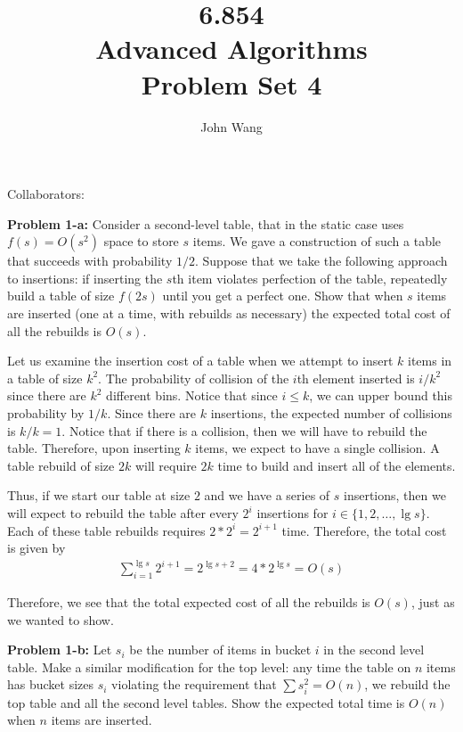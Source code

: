 \documentclass[psamsfonts]{amsart}
\title{6.854 \\
Advanced Algorithms \\
Problem Set 4}
\author{John Wang}
\newenvironment{sol}{\vspace{0.25cm}{\large \bfseries Solution:}}{\qedsymbol}
\newenvironment{prob}[1]{\begin{framed}{\large \bfseries Problem #1:}}{\end{framed}}
\begin{document}
\maketitle

Collaborators: 

\begin{prob}{1-a}
Consider a second-level table, that in the static case uses $f(s) = O(s^2)$ space to store $s$ items. We gave a construction of such a table that succeeds with probability $1/2$. Suppose that we take the following approach to insertions: if inserting the $s$th item violates perfection of the table, repeatedly build a table of size $f(2s)$ until you get a perfect one. Show that when $s$ items are inserted (one at a time, with rebuilds as necessary) the expected total cost of all the rebuilds is $O(s)$. 
\end{prob}

\begin{sol}
Let us examine the insertion cost of a table when we attempt to insert $k$ items in a table of size $k^2$. The probability of collision of the $i$th element inserted is $i/k^2$ since there are $k^2$ different bins. Notice that since $i \leq k$, we can upper bound this probability by $1/k$. Since there are $k$ insertions, the expected number of collisions is $k/k = 1$. Notice that if there is a collision, then we will have to rebuild the table. Therefore, upon inserting $k$ items, we expect to have a single collision. A table rebuild of size $2k$ will require $2k$ time to build and insert all of the elements. 

Thus, if we start our table at size $2$ and we have a series of $s$ insertions, then we will expect to rebuild the table after every $2^i$ insertions for $i \in \{1,2, \ldots, \lg s\}$. Each of these table rebuilds requires $2* 2^i = 2^{i+1}$ time. Therefore, the total cost is given by
\begin{eqnarray}
\sum_{i=1}^{\lg s} 2^{i+1} = 2^{\lg s + 2} = 4* 2^{\lg s} = O(s)
\end{eqnarray}

Therefore, we see that the total expected cost of all the rebuilds is $O(s)$, just as we wanted to show.
\end{sol}

\begin{prob}{1-b}
Let $s_i$ be the number of items in bucket $i$ in the second level table. Make a similar modification for the top level: any time the table on $n$ items has bucket sizes $s_i$ violating the requirement that $\sum s_i^2 = O(n)$, we rebuild the top table and all the second level tables. Show the expected total time is $O(n)$ when $n$ items are inserted.
\end{prob}
\begin{sol}

\end{sol}
\end{document}
